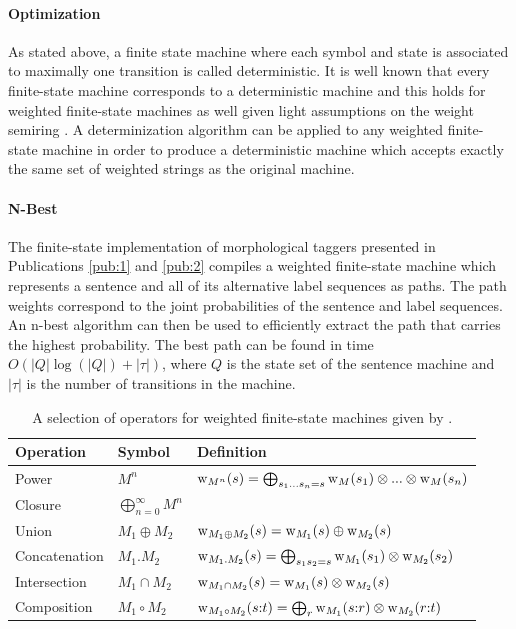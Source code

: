 \paragraph{Optimization} As stated above, a finite state machine where
each symbol and state is associated to maximally one transition is
called deterministic. It is well known that every finite-state machine
corresponds to a deterministic machine and this holds for weighted
finite-state machines as well given light assumptions on the weight
semiring \citep{Mohri2002}. A determinization algorithm can be applied
to any weighted finite-state machine in order to produce a
deterministic machine which accepts exactly the same set of weighted
strings as the original machine.

\paragraph{N-Best} The finite-state implementation of morphological
taggers presented in Publications \ref{pub:1} and \ref{pub:2} compiles
a weighted finite-state machine which represents a sentence and all of
its alternative label sequences as paths. The path weights correspond
to the joint probabilities of the sentence and label sequences. An
n-best algorithm \citep{Mohri2002} can then be used to efficiently
extract the path that carries the highest probability. The best path
can be found in time $O(|Q| \log(|Q|) + |\tau|)$, where $Q$ is the state
set of the sentence machine and $|\tau|$ is the number of transitions
in the machine.

\begin{table}[!ftb]
\begin{center}
\begin{tabular}{lll}
Operation & Symbol & Definition \\
\hline
Power & $M^n$ & $\mbox{${\rm w}$}_{M^n}(s) = \bigoplus_{s_1 ... s_n = s} \mbox{${\rm w}$}_{M}(s_1) \otimes ... \otimes \mbox{${\rm w}$}_{M}(s_n)$\\ 
Closure & $\bigoplus_{n = 0}^\infty M^n$ &  \\
Union & $M_1 \oplus M_2$ & $\mbox{${\rm w}$}_{M_1 \oplus M_2}(s) = \mbox{${\rm w}$}_{M_1}(s) \oplus \mbox{${\rm w}$}_{M_2}(s)$\\ 
Concatenation & $M_1.M_2$ & $\mbox{${\rm w}$}_{M_1.M_2}(s) = \bigoplus_{s_1s_2 = s} \mbox{${\rm w}$}_{M_1}(s_1) \otimes \mbox{${\rm w}$}_{M_2}(s_2)$\\
Intersection & $M_1 \cap M_2$ & $\mbox{${\rm w}$}_{M_1 \cap M_2}(s) = \mbox{${\rm w}$}_{M_1}(s) \otimes \mbox{${\rm w}$}_{M_2}(s)$ \\
Composition & $M_1 \circ M_2$ & $\mbox{${\rm w}$}_{M_1 \circ M_2}(s{\rm :}t) = \bigoplus_{r} \mbox{${\rm w}$}_{M_1}(s{\rm :}r) \otimes \mbox{${\rm w}$}_{M_2}(r{\rm :}t)$\\
\end{tabular}
\caption{A selection of operators for weighted finite-state machines
  given by
  \cite{Allauzen2007}.}\label{tab:fs-algebra}
\end{center}
\end{table}

